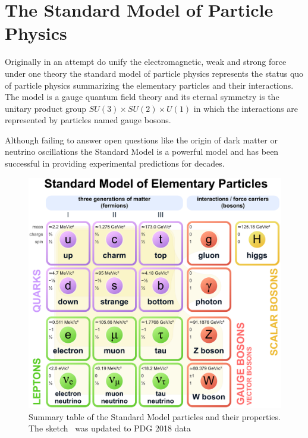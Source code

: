 



\chapter{The Standard Model of Particle Physics}
\label{chp:sm}

Originally in an attempt do unify the electromagnetic, weak and strong force under one theory the standard model of particle physics represents the status quo of particle physics summarizing the elementary particles and their interactions.
The model is a gauge quantum field theory and its eternal symmetry is the unitary product group $SU(3) \times SU(2) \times U(1)$ in which the interactions are represented by particles named gauge bosons.

Although failing to answer open questions like the origin of dark matter or neutrino oscillations the Standard Model is a powerful model and has been successful in providing experimental predictions for decades.

\begin{figure}
	\centering
	\includegraphics[width=\textwidth]{figures_SM/standard_model.eps}
	\caption[Standard Model particles]{Summary table of the Standard Model particles and their properties. The sketch~\cite{standard_model} was updated to PDG 2018 data~\cite{PDG}}
	\label{fig:sm}
\end{figure}



